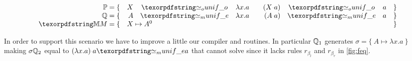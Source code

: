 $$
\begin{array}{rrclrcll}
\foUnifPb = \{ & X & \Uo & \lambda x.a \quad & (X\appsep a) & \Uo & a & \}\\
\hoUnifPb = \{ & A & \Ue & \lambda x.a \quad & (A\appsep a) & \Ue & a & \}\\
\mapStore = \{ & \multicolumn{6}{l}{X \mapsto A^{0}} & \}
\end{array}
$$






\noindent
In order to support this scenario we have to improve a little our compiler
and \progress routines.
In particular $\mathbb{Q}_1$ generates $\sigma = \{~ A
\mapsto \lambda x. a ~\}$ making $\sigma\mathbb{Q}_2$ equal to
$(\lambda x. a) \appsep a \Ue a$ that \Ue{} cannot solve since it
lacks rules $r_{\beta_l}$ and $r_{\beta_r}$ in \cref{fig:feq}.

